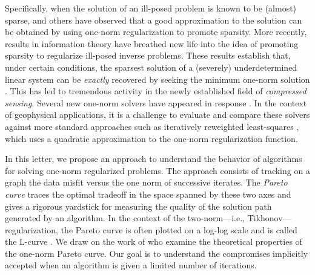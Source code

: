 Specifically, when the solution of an ill-posed problem is known to be
(almost) sparse, \cite{oldenburg83} and others have observed that a
good approximation to the solution can be obtained by using one-norm
regularization to promote sparsity.  More recently, results in
information theory have breathed new life into the idea of promoting
sparsity to regularize ill-posed inverse problems. These results
establish that, under certain conditions, the sparsest solution of a
(severely) underdetermined linear system can be \textit{exactly}
recovered by seeking the minimum one-norm solution
\cite[][]{candes06robust,donoho06cs,rauhut07}.  This has led to
tremendous activity in the newly established field of
\textit{compressed sensing}. Several new one-norm solvers have
appeared in response \cite[see, e.g.,][ and references
therein]{daub04it,vandenberg07}.  In the context of geophysical
applications, it is a challenge to evaluate and compare these solvers
against more standard approaches such as iteratively reweighted
least-squares \cite[IRLS -][]{gersztenkorn86irls}, which uses a
quadratic approximation to the one-norm regularization function.

In this letter, we propose an approach to understand the behavior of
algorithms for solving one-norm regularized problems. The approach
consists of tracking on a graph the data misfit versus the one norm of
successive iterates. The \emph{Pareto curve} traces the optimal
tradeoff in the space spanned by these two axes and gives a rigorous
yardstick for measuring the quality of the solution path generated by
an algorithm. In the context of the two-norm---i.e.,
Tikhonov---regularization, the Pareto curve is often plotted on a
log-log scale and is called the L-curve \cite[][]{lawson74}. We draw
on the work of \cite{vandenberg07} who examine the theoretical
properties of the one-norm Pareto curve. Our goal is to understand the
compromises implicitly accepted when an algorithm is given a limited
number of iterations.

